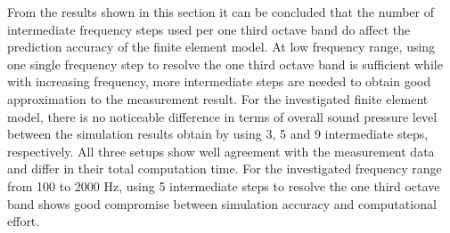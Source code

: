 From the results shown in this section it can be concluded that the number of intermediate frequency steps used per one third octave band do affect the prediction accuracy of the finite element model. At low frequency range, using one single frequency step to resolve the one third octave band is sufficient while with increasing frequency, more intermediate steps are needed to obtain good approximation to the measurement result. For the investigated finite element model, there is no noticeable difference in terms of overall sound pressure level between the simulation results obtain by using 3, 5 and 9 intermediate steps, respectively. All three setups show well agreement with the measurement data and differ in their total computation time. For the investigated frequency range from 100 to 2000 Hz, using 5 intermediate steps to resolve the one third octave band shows good compromise between simulation accuracy and computational effort. 